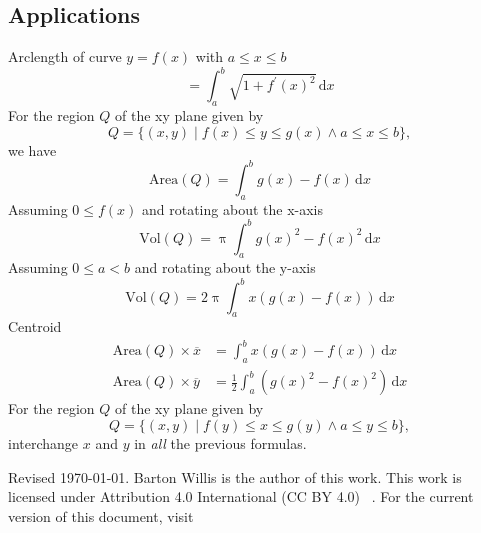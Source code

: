 \documentclass[letterpaper,9pt,fleqn]{extarticle}
\begin{document}
\begin{multicols*}{2}
\section*{Applications}
Arclength of curve \(y = f(x)\) with \(a \leq x \leq b\)
\[
   = \int_a^b \sqrt{1 + f^\prime(x)^2} \, \mathrm{d} x
\]
For the region \(Q\) of the xy plane given by
\[
   Q = \{(x,y) \mid f(x) \leq y \leq g(x) \land a \leq x \leq b \},
\]
we have
\[
  \mbox{Area}(Q) = \int_a^b g(x) - f(x) \, \mathrm{d} x
\]  
Assuming \(0 \leq f(x)\) and rotating about the \mbox{x-axis}
\[
  \mbox{Vol}(Q) = \uppi \int_a^b g(x)^2 - f(x)^2 \, \mathrm{d} x
\]
Assuming \(0 \leq a < b\) and rotating about the y-axis
\[
  \mbox{Vol}(Q) = 2 \uppi \int_a^b x (g(x)  - f(x)) \, \mathrm{d} x
\]
Centroid
\begin{align*}
    \mbox{Area}(Q) \times \overline{x} &=  \int_a^b x \left(g(x) - f(x) \right) \, \mathrm{d} x \\
     \mbox{Area}(Q) \times \overline{y} &=  \frac{1}{2} \int_a^b  \left (g(x)^2  - f(x)^2 \right) \, \mathrm{d} x
\end{align*}
For the region \(Q\) of the xy plane given by
\[
   Q = \{(x,y) \mid f(y) \leq x \leq g(y) \land a \leq y \leq b \},
\]
interchange \(x\) and \(y\) in \emph{all} the previous formulas. 
\begin{comment}
Specifically
we have
\[
  \mbox{Area}(Q) = \int_a^b g(y) - f(y) \, \mathrm{d} y
\]  
Assuming \(0 \leq f(y)\) and rotating about the \mbox{y-axis}
\[
  \mbox{Vol}(Q) = \uppi \int_a^b g(y)^2 - f(y)^2 \, \mathrm{d} y
\]
Assuming \(a \geq 0\) and rotating about the x-axis
\[
  \mbox{Vol}(Q) = 2 \uppi \int_a^b y (g(y)  - f(y)) \, \mathrm{d} y
\]
Centroid
\begin{align*}
    \mbox{Area}(Q) \times \overline{y} &=  \int_a^b y \left(g(y) - f(y) \right) \, \mathrm{d} y \\
     \mbox{Area}(Q) \times \overline{x} &=  \frac{1}{2} \int_a^b  \left (g(y)^2  - f(y)^2 \right) \, \mathrm{d} y
\end{align*}
\end{comment}
\vfill 

\noindent Revised \today. Barton Willis is the author of this work. This work is
licensed under Attribution 4.0 International (CC BY 4.0) \,  . For the current version of
this document, visit \,  

\end{multicols*}
\end{document}
